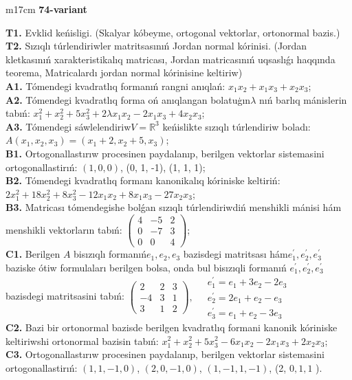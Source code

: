 \documentclass{article}
\begin{document}
\begin{tabular}{m{17cm}}
\textbf{74-variant}
\newline

\textbf{T1.} Evklid keńisligi. (Skalyar kóbeyme, ortogonal vektorlar, ortonormal bazis.) \\
\textbf{T2.} Sızıqlı túrlendiriwler matritsasınıń Jordan normal kórinisi. (Jordan kletkasınıń xarakteristikalıq matricası, Jordan matricasınıń uqsaslıǵı haqqında teorema,  Matricalardı jordan normal kórinisine keltiriw) \\
\textbf{A1.} Tómendegi kvadratlıq formanıń rangni anıqlań: \(x_{1}x_{2} + x_{1}x_{3} + x_{2}x_{3}\); \\
\textbf{A2.} Tómendegi kvadratlıq forma oń anıqlangan bolatuģın\(\lambda\) nıń barlıq mánislerin tabıń: \(x_{1}^{2} + x_{2}^{2} + 5x_{3}^{2} + 2\lambda x_{1}x_{2} - 2x_{1}x_{3} + 4x_{2}x_{3}\); \\
\textbf{A3.} Tómendegi sáwlelendiriw\(V = \mathbb{R}^{3}\) keńislikte sızıqlı túrlendiriw boladı: \(A\left( x_{1},x_{2},x_{3} \right) = \left( x_{1} + 2,x_{2} + 5,x_{3} \right)\); \\
\textbf{B1.} Ortogonallastırıw procesinen paydalanıp, berilgen vektorlar sistemasini ortogonallastirıń: \((1,0,0)\), (0, 1, -1), (1, 1, 1); \\
\textbf{B2.} Tómendegi kvadratlıq formanı kanonikalıq kóriniske keltiriń: \(2x_{1}^{2} + 18x_{2}^{2} + 8x_{3}^{2} - 12x_{1}x_{2} + 8x_{1}x_{3} - 27x_{2}x_{3}\); \\
\textbf{B3.} Matricası tómendegishe bolǵan sızıqlı túrlendiriwdiń menshikli mánisi hám menshikli vektorların tabıń: \(\begin{pmatrix} 4 & - 5 & 2 \\ 0 & - 7 & 3 \\ 0 & 0 & 4 \end{pmatrix}\); \\
\textbf{C1.} Berilgen \(A\) bisızıqlı formanıń\(e_{1},e_{2},e_{3}\) bazisdegi matritsası hám\(e_{1}^{'},e_{2}^{'},e_{3}^{'}\) baziske ótiw formulaları berilgen bolsa, onda bul bisızıqli formanıń \(e_{1}^{'},e_{2}^{'},e_{3}^{'}\) bazisdegi matritsasini tabıń: \(\begin{pmatrix} 2 & 2 & 3 \\  - 4 & 3 & 1 \\ 3 & 1 & 2 \end{pmatrix},\ \begin{matrix}  & e_{1}^{'} = e_{1} + 3e_{2} - 2e_{3} \\  & e_{2}^{'} = 2e_{1} + e_{2} - e_{3} \\  & e_{3}^{'} = e_{1} + e_{2} - 3e_{3} \end{matrix}\) \\
\textbf{C2.} Bazi bir ortonormal bazisde berilgen kvadratlıq formani kanonik kóriniske keltiriwshi ortonormal bazisin tabıń: \(x_{1}^{2} + x_{2}^{2} + 5x_{3}^{2} - 6x_{1}x_{2} - 2x_{1}x_{3} + 2x_{2}x_{3}\); \\
\textbf{C3.} Ortogonallastırıw procesinen paydalanıp, berilgen vektorlar sistemasini ortogonallastirıń: \((1,1, - 1,0)\), \((2,0, - 1,0)\), \((1, - 1,1, - 1)\), (2, \(0,1,1\) ). \\

\end{tabular}
\end{document}
